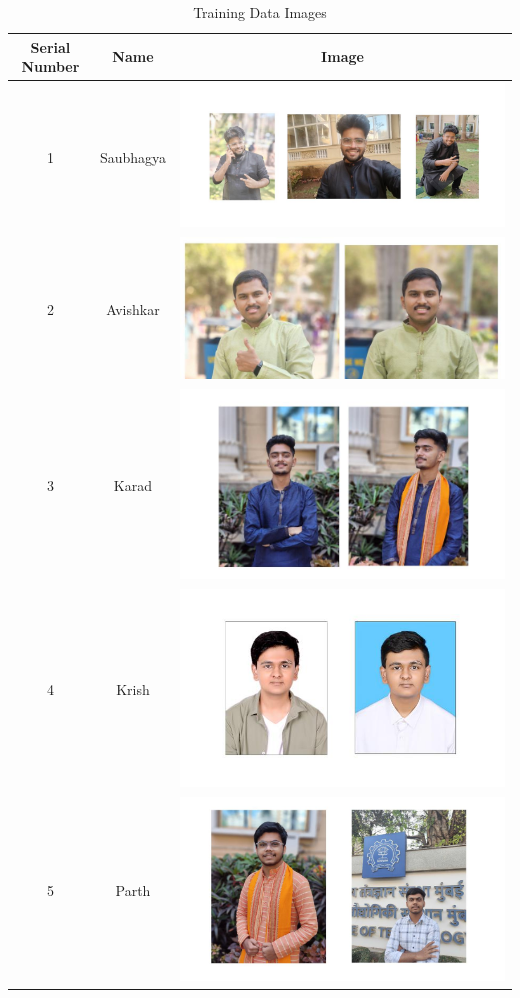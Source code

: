 \documentclass[openany]{report}
\begin{document}
\begin{table}[H]
    \centering
    \begin{tabular}{|c|c|c|}
        \hline
        \textbf{Serial Number} & \textbf{Name} & \textbf{Image}                                        \\
        \hline
        1                      & Saubhagya     & \includegraphics[height=.25\textwidth]{saubhagya.jpg} \\
        \hline
        2                      & Avishkar      & \includegraphics[height=.25\textwidth]{avishkar.jpg}  \\
        \hline
        3                      & Karad         & \includegraphics[height=.25\textwidth]{karad.jpg}     \\
        \hline
        4                      & Krish         & \includegraphics[height=.25\textwidth]{krish.jpg}     \\
        \hline
        5                      & Parth         & \includegraphics[height=.25\textwidth]{parth.jpg}     \\
        \hline
    \end{tabular}
    \caption{Training Data Images}
\end{table}
\end{document}
